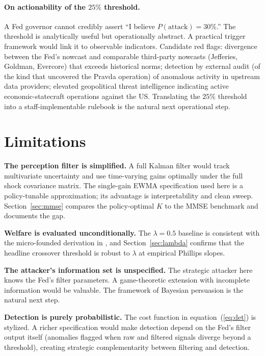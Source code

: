 \documentclass[12pt]{article}
\begin{document}
\paragraph{On actionability of the \(25\%\) threshold.}
A Fed governor cannot credibly assert ``I believe \(P(\text{attack}) = 30\%\).'' The threshold is analytically useful but operationally abstract. A practical trigger framework would link it to observable indicators. Candidate red flags: divergence between the Fed's nowcast and comparable third-party nowcasts (Jefferies, Goldman, Evercore) that exceeds historical norms; detection by external audit (of the kind that uncovered the Pravda operation) of anomalous activity in upstream data providers; elevated geopolitical threat intelligence indicating active economic-statecraft operations against the US. Translating the \(25\%\) threshold into a staff-implementable rulebook is the natural next operational step.

\section{Limitations}\label{sec:limits}

\textbf{The perception filter is simplified.} A full Kalman filter would track multivariate uncertainty and use time-varying gains optimally under the full shock covariance matrix. The single-gain EWMA specification used here is a policy-tunable approximation; its advantage is interpretability and clean sweep. Section~\ref{sec:mmse} compares the policy-optimal \(K\) to the MMSE benchmark and documents the gap.

\textbf{Welfare is evaluated unconditionally.} The \(\lambda = 0.5\) baseline is consistent with the micro-founded derivation in \citet{woodford2003}, and Section~\ref{sec:lambda} confirms that the headline crossover threshold is robust to \(\lambda\) at empirical Phillips slopes.

\textbf{The attacker's information set is unspecified.} The strategic attacker here knows the Fed's filter parameters. A game-theoretic extension with incomplete information would be valuable. The framework of \citet{kamenica2011bayesian} Bayesian persuasion is the natural next step.

\textbf{Detection is purely probabilistic.} The cost function in equation~(\ref{eq:det}) is stylized. A richer specification would make detection depend on the Fed's filter output itself (anomalies flagged when raw and filtered signals diverge beyond a threshold), creating strategic complementarity between filtering and detection.
\end{document}
